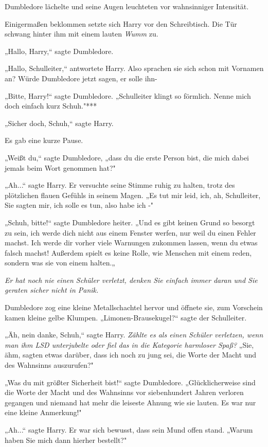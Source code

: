 {Dumbledore lächelte und seine Augen leuchteten vor wahnsinniger Intensität.

Einigermaßen beklommen setzte sich Harry vor den Schreibtisch. Die Tür schwang hinter ihm mit einem lauten \emph{Wumm} zu.

„Hallo, Harry,“ sagte Dumbledore.

„Hallo, Schulleiter,“ antwortete Harry. Also sprachen sie sich schon mit Vornamen an? Würde Dumbledore jetzt sagen, er solle ihn-

„Bitte, Harry!“ sagte Dumbledore. „Schulleiter klingt so förmlich. Nenne mich doch einfach kurz Schuh."***

„Sicher doch, Schuh,“ sagte Harry.

Es gab eine kurze Pause.

„Weißt du,“ sagte Dumbledore, „dass du die erste Person bist, die mich dabei jemals beim Wort genommen hat?"

„Ah...“ sagte Harry. Er versuchte seine Stimme ruhig zu halten, trotz des plötzlichen flauen Gefühls in seinem Magen. „Es tut mir leid, ich, ah, Schulleiter, Sie sagten mir, ich solle es tun, also habe ich -"

„Schuh, bitte!“ sagte Dumbledore heiter. „Und es gibt keinen Grund so besorgt zu sein, ich werde dich nicht aus einem Fenster werfen, nur weil du einen Fehler machst. Ich werde dir vorher viele Warnungen zukommen lassen, wenn du etwas falsch machst! Außerdem spielt es keine Rolle, wie Menschen mit einem reden, sondern was sie von einem halten.„

\emph{Er hat noch nie einen Schüler verletzt, denken Sie einfach immer daran und Sie geraten sicher nicht in Panik.}

Dumbledore zog eine kleine Metallschachtel hervor und öffnete sie, zum Vorschein kamen kleine gelbe Klumpen. „Limonen-Brausekugel?“ sagte der Schulleiter.

„Äh, nein danke, Schuh,“ sagte Harry. \emph{Zählte es als einen Schüler verletzen, wenn man ihm LSD unterjubelte oder fiel das in die Kategorie harmloser Spaß?} „Sie, ähm, sagten etwas darüber, dass ich noch zu jung sei, die Worte der Macht und des Wahnsinns auszurufen?"

„Was du mit größter Sicherheit bist!“ sagte Dumbledore. „Glücklicherweise sind die Worte der Macht und des Wahnsinns vor siebenhundert Jahren verloren gegangen und niemand hat mehr die leiseste Ahnung wie sie lauten. Es war nur eine kleine Anmerkung!"

„Ah...“ sagte Harry. Er war sich bewusst, dass sein Mund offen stand. „Warum haben Sie mich dann hierher bestellt?"

}
